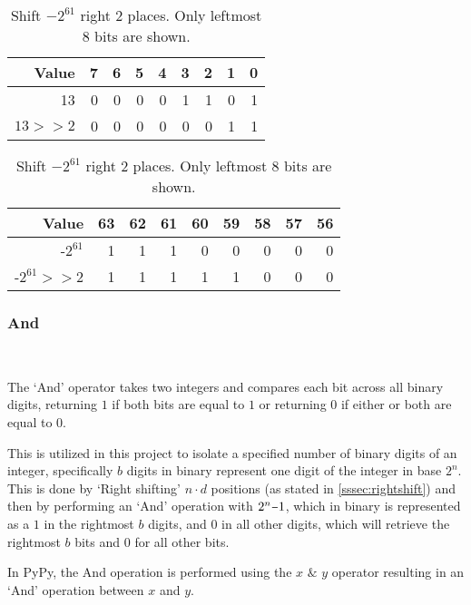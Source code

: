\documentclass[12pt]{article}
\newcommand{\minus}{\scalebox{0.75}[1.0]{$-$}}
\begin{document}
\begin{table}[!htb]
	
\setlength{\tabcolsep}{4.5pt}
\begin{minipage}{.45\textwidth}
	\centering

		\begin{tabular}[t]{r|rrrrrrrr}
			\hline
			 Value   &   7 &   6 &   5 &   4 &   3 &   2 &   1 &   0 \\
			 \hline
			 13      &   0 &   0 &   0 &   0 &   1 &   1 &   0 &   1 \\
			 $13 \ensuremath{>}\ensuremath{>} 2$ &   0 &   0 &   0 &   0 &   0 &   0 &   1 &   1 \\
			 \hline
		\end{tabular}
		\vspace{0.25cm}
	
	\caption{Shift 13 right 2 bits.\quad \quad \quad Only rightmost 8 bits are shown}
	
\end{minipage}\hfill%
	\begin{minipage}{.55\textwidth}
		\centering

		\begin{tabular}[t]{r|rrrrrrrr}
			\hline
			 Value   &   63 &  62 &   61 &   60 &   59 &   58 &   57 &   56 \\
			\hline
			 -$2^{61}$      &   1 &    1 &    1 &    0 &    0 &    0 &    0 &    0 \\
			 -$2^{61} \ensuremath{>}\ensuremath{>} 2$ &    1 &    1 &    1 &    1 &    1 &    0 &    0 &    0 \\
			\hline
		\end{tabular}


		\vspace{0.25cm}
		\caption{Shift $-2^{61}$ right 2 places. \quad \quad \quad \quad \quad Only leftmost 8 bits are shown.}
		\label{table2}
	\end{minipage}\hfill%

\end{table}
\pagebreak
\subsubsection{And}\
\label{sssec:and}
\par
The `And' operator takes two integers and compares each bit across all binary digits, returning $1$ if both bits are equal to $1$ or returning $0$ if either or both are equal to $0$.
\par
 This is utilized in this project to isolate a specified number of binary digits of an integer, specifically $b$ digits in binary represent one digit of the integer in base $2^{n}$. This is done by `Right shifting' $n \cdot d$ positions (as stated in \ref{sssec:rightshift}) and then by performing an `And' operation with $2^{n}\minus1$, which in binary is represented as a $1$ in the rightmost $b$ digits, and 0 in all other digits, which will retrieve the rightmost $b$ bits and 0 for all other bits.
\par
In PyPy, the And operation is performed using the  $x$ $\&$ $y$ operator resulting in an `And' operation between $x$ and $y$.
\par
\end{document}
